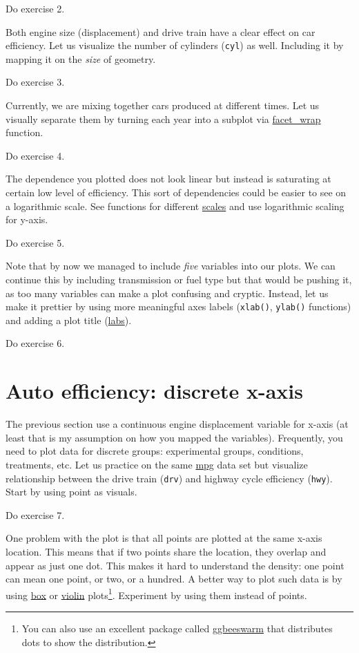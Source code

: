 \documentclass[
]{book}
\begin{document}
Do exercise 2.

Both engine size (displacement) and drive train have a clear effect on car efficiency. Let us visualize the number of cylinders (\texttt{cyl}) as well. Including it by mapping it on the \emph{size} of geometry.

Do exercise 3.

Currently, we are mixing together cars produced at different times. Let us visually separate them by turning each year into a subplot via \href{https://ggplot2.tidyverse.org/reference/facet_wrap.html}{facet\_wrap} function.

Do exercise 4.

The dependence you plotted does not look linear but instead is saturating at certain low level of efficiency. This sort of dependencies could be easier to see on a logarithmic scale. See functions for different \href{https://ggplot2.tidyverse.org/reference/scale_continuous.html}{scales} and use logarithmic scaling for y-axis.

Do exercise 5.

Note that by now we managed to include \emph{five} variables into our plots. We can continue this by including transmission or fuel type but that would be pushing it, as too many variables can make a plot confusing and cryptic. Instead, let us make it prettier by using more meaningful axes labels (\texttt{xlab()}, \texttt{ylab()} functions) and adding a plot title (\href{https://ggplot2.tidyverse.org/reference/labs.html}{labs}).

Do exercise 6.

\hypertarget{auto-efficiency-discrete-x-axis}{%
\section{Auto efficiency: discrete x-axis}\label{auto-efficiency-discrete-x-axis}}

The previous section use a continuous engine displacement variable for x-axis (at least that is my assumption on how you mapped the variables). Frequently, you need to plot data for discrete groups: experimental groups, conditions, treatments, etc. Let us practice on the same \href{https://ggplot2.tidyverse.org/reference/mpg.html}{mpg} data set but visualize relationship between the drive train (\texttt{drv}) and highway cycle efficiency (\texttt{hwy}). Start by using point as visuals.

Do exercise 7.

One problem with the plot is that all points are plotted at the same x-axis location. This means that if two points share the location, they overlap and appear as just one dot. This makes it hard to understand the density: one point can mean one point, or two, or a hundred. A better way to plot such data is by using \href{https://ggplot2.tidyverse.org/reference/geom_boxplot.html}{box} or \href{https://ggplot2.tidyverse.org/reference/geom_violin.html}{violin} plots\footnote{You can also use an excellent package called \href{https://github.com/eclarke/ggbeeswarm}{ggbeeswarm} that distributes dots to show the distribution.}. Experiment by using them instead of points.
\end{document}
